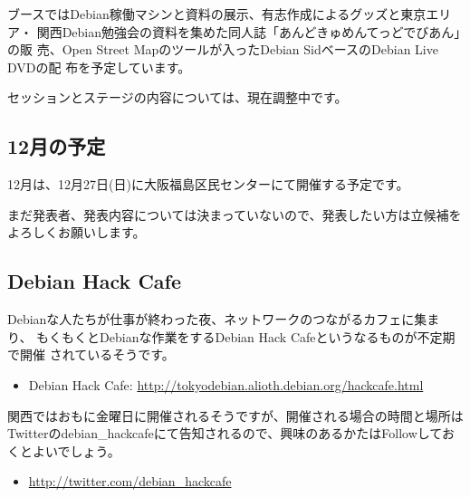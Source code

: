 \documentclass[mingoth,a4paper]{jsarticle}
\begin{document}
ブースではDebian稼働マシンと資料の展示、有志作成によるグッズと東京エリア・
関西Debian勉強会の資料を集めた同人誌「あんどきゅめんてっどでびあん」の販
売、Open Street Mapのツールが入ったDebian SidベースのDebian Live DVDの配
布を予定しています。

セッションとステージの内容については、現在調整中です。

\subsection{12月の予定}

12月は、12月27日(日)に大阪福島区民センターにて開催する予定です。

まだ発表者、発表内容については決まっていないので、発表したい方は立候補を
よろしくお願いします。

\subsection{Debian Hack Cafe}

Debianな人たちが仕事が終わった夜、ネットワークのつながるカフェに集まり、
もくもくとDebianな作業をするDebian Hack Cafeというなるものが不定期で開催
されているそうです。

\begin{itemize}
 \item Debian Hack Cafe:
       \url{http://tokyodebian.alioth.debian.org/hackcafe.html}
\end{itemize}

関西ではおもに金曜日に開催されるそうですが、開催される場合の時間と場所は
Twitterのdebian\_hackcafeにて告知されるので、興味のあるかたはFollowしてお
くとよいでしょう。

\begin{itemize}
 \item \url{http://twitter.com/debian_hackcafe}
\end{itemize}

\mbox{}\newpage
\mbox{}\newpage

\printindex
 \cleartooddpage
\end{document}
